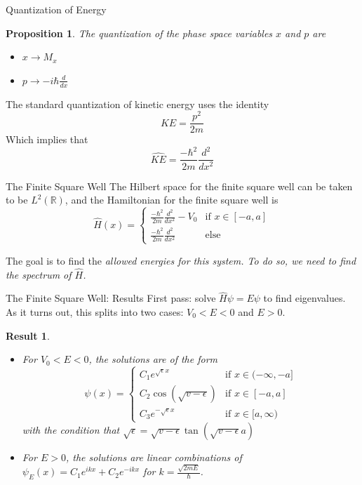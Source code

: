 \documentclass{beamer}
\newtheorem{proposition}{Proposition}
\newtheorem{result}{Result}
\begin{document}
\begin{frame}{Quantization of Energy}
    \begin{proposition}
        The quantization of the phase space variables $x$ and $p$ are
        \begin{itemize}
            \item $x \to M_x$
            \item $p \to -i\hbar\frac{d}{dx}$
        \end{itemize}
    \end{proposition}
    \begin{example}
        The standard quantization of kinetic energy uses the identity
        \[
            KE = \frac{p^2}{2m}
        \]
        Which implies that
        \[
            \hat{KE} = \frac{-\hbar^2}{2m}\frac{d^2}{dx^2}
        \]
    \end{example}
\end{frame}
\begin{frame}{The Finite Square Well}
    The Hilbert space for the finite square well can be taken to be
    $L^2(\mathbb{R})$, and
    the Hamiltonian for the finite square well is 
    \[
        \hat{H}(x) =
        \begin{cases}
            \frac{-\hbar^2}{2m}\frac{d^2}{dx^2} - V_0& \text{if } x\in[-a,a]\\
            \frac{-\hbar^2}{2m}\frac{d^2}{dx^2} &\text{else}
        \end{cases}
    \]

    The goal is to find the \em allowed energies \em for this system. To do so,
    we need to find the spectrum of $\hat{H}$.
\end{frame}

\begin{frame}{The Finite Square Well: Results}
    First pass: solve $\hat{H}\psi = E\psi$ to find eigenvalues.
    As it turns out, this splits into two cases: $V_0<E<0$ and $E>0$.
    \begin{result}
        \begin{itemize}
            \item For $V_0<E<0$, the solutions are of the form
    \[
    \psi(x) =
    \begin{cases}
        C_1e^{\sqrt{\epsilon}x}& \text{if } x\in(-\infty,-a]\\
        C_2\cos(\sqrt{v-\epsilon})& \text{if } x\in[-a,a]\\
        C_3e^{-\sqrt{\epsilon}x}& \text{if } x\in [a, \infty)
    \end{cases}
    \]
                with the condition that $
    \sqrt{\epsilon} = \sqrt{v-\epsilon}\tan(\sqrt{v-\epsilon}a)$

            \item For $E>0$, the solutions are linear combinations of
                $\psi_E(x) = C_1e^{ikx} + C_2e^{-ikx}$ for
                $k=\frac{\sqrt{2mE}}{\hbar}$.
        \end{itemize}
    \end{result}
\end{frame}
\end{document}
